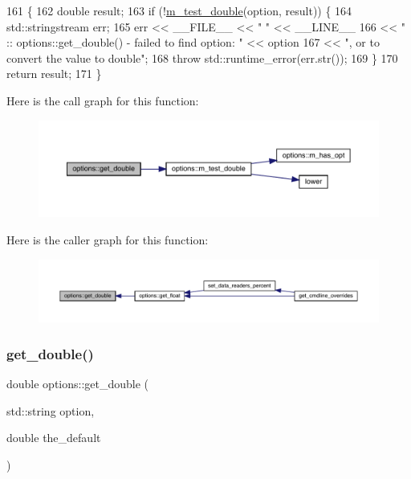 \begin{DoxyCode}
161 \{
162   \textcolor{keywordtype}{double} result;
163   \textcolor{keywordflow}{if} (!\hyperlink{classoptions_a0eebdb8dbce454720ef9251fcd7abf24}{m\_test\_double}(option, result)) \{
164     std::stringstream err;
165     err << \_\_FILE\_\_ << \textcolor{stringliteral}{" "} << \_\_LINE\_\_
166         << \textcolor{stringliteral}{" :: options::get\_double() - failed to find option: "} << option
167         << \textcolor{stringliteral}{", or to convert the value to double"};
168     \textcolor{keywordflow}{throw} std::runtime\_error(err.str());
169   \}
170   \textcolor{keywordflow}{return} result;
171 \}
\end{DoxyCode}
Here is the call graph for this function\+:\nopagebreak
\begin{figure}[H]
\begin{center}
\leavevmode
\includegraphics[width=350pt]{classoptions_a0e8ff0d44b9192754451f9dcd47cd559_cgraph}
\end{center}
\end{figure}
Here is the caller graph for this function\+:\nopagebreak
\begin{figure}[H]
\begin{center}
\leavevmode
\includegraphics[width=350pt]{classoptions_a0e8ff0d44b9192754451f9dcd47cd559_icgraph}
\end{center}
\end{figure}
\mbox{\label{classoptions_aa78e7d95dc59a2d25987546cdbab7872}} 
\subsubsection{\texorpdfstring{get\+\_\+double()}{get\_double()}\hspace{0.1cm}{\footnotesize\ttfamily [2/2]}}
{\footnotesize\ttfamily double options\+::get\+\_\+double (\begin{DoxyParamCaption}\item[{std\+::string}]{option,  }\item[{double}]{the\+\_\+default }\end{DoxyParamCaption})}




